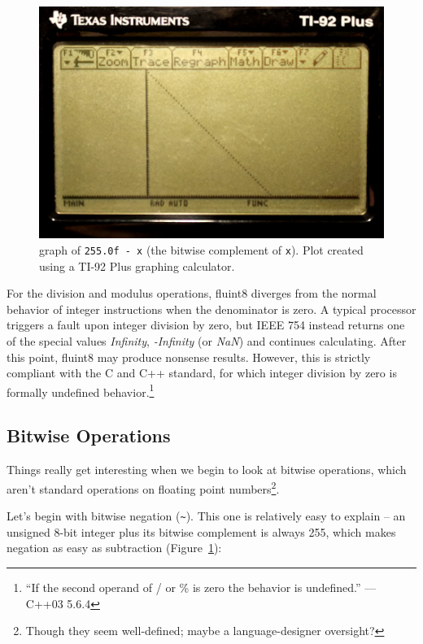 \documentclass{acmsiggraph}
\theoremstyle{remark}
\theoremstyle{definition}
\begin{document}
\begin{figure}[tb!]
\includegraphics[width=\columnwidth]{not.jpg}
\caption{\label{fig-not-graph} graph of {\tt 255.0f - x} (the bitwise complement of {\tt x}).
{\small Plot created using a TI-92 Plus graphing calculator.}}
\end{figure}


For the division and modulus operations, fluint8 diverges from the
normal behavior of integer instructions when the denominator is zero.
A typical processor triggers a fault upon integer division by zero,
but IEEE 754 instead returns one of the special values {\it Infinity},
{\it -Infinity} (or {\it NaN}) and continues calculating. After this
point, fluint8 may produce nonsense results. However, this is strictly
compliant with the C and C++ standard, for which integer division by
zero is formally undefined behavior.\footnote{``If the second operand of / or \% is zero the behavior is undefined.'' --- C++03 5.6.4}

\subsection{Bitwise Operations}

Things really get interesting when we begin to look at bitwise operations, which aren't standard operations on floating point numbers\footnote{Though they seem well-defined; maybe a language-designer oversight?}.

Let's begin with bitwise negation ({\tt \textasciitilde}).
This one is relatively easy to explain -- an unsigned 8-bit integer plus its bitwise complement is always 255, which makes negation as easy as subtraction (Figure~\ref{fig-not-graph}):
\end{document}
